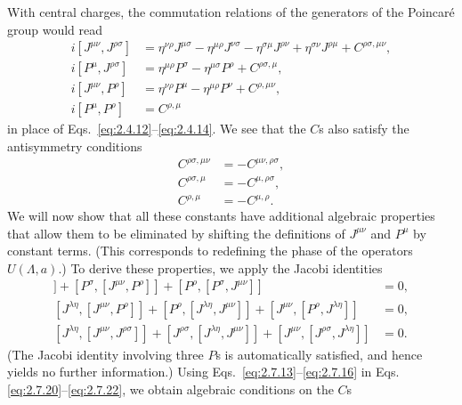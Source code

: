 With central charges, the commutation relations of the generators of the
Poincar\'e group would read
\begin{align}
  i[J^{\mu\nu},J^{\rho\sigma}]
  &={}
    \eta^{\nu\rho}J^{\mu\sigma}
    -\eta^{\mu\rho}J^{\nu\sigma}
    -\eta^{\sigma\mu}J^{\rho\nu}
    +\eta^{\sigma\nu}J^{\rho\mu}
    +C^{\rho\sigma,\mu\nu},
  \tag{2.7.13}\label{eq:2.7.13}\\
  i[P^\mu,J^{\rho\sigma}]
  &={}
    \eta^{\mu\rho}P^\sigma-\eta^{\mu\sigma}P^\rho
    +C^{\rho\sigma,\mu},
  \tag{2.7.14}\label{eq:2.7.14}\\
  i[J^{\mu\nu},P^\rho]
  &={}
    \eta^{\nu\rho}P^\mu-\eta^{\mu\rho}P^\nu
    +C^{\rho,\mu\nu},
  \tag{2.7.15}\label{eq:2.7.15}\\
  i[P^\mu,P^\rho]&=C^{\rho,\mu}
  \tag{2.7.16}\label{eq:2.7.16}
\end{align}
in place of Eqs.~\eqref{eq:2.4.12}--\eqref{eq:2.4.14}. We see that the $C$s also satisfy the
antisymmetry conditions
\begin{align}
  C^{\rho\sigma,\mu\nu}&=-C^{\mu\nu,\rho\sigma},
  \tag{2.7.17}\label{eq:2.7.17}\\
  C^{\rho\sigma,\mu}&=-C^{\mu,\rho\sigma},
  \tag{2.7.18}\label{eq:2.7.18}\\
  C^{\rho,\mu}&=-C^{\mu,\rho}.
  \tag{2.7.19}\label{eq:2.7.19}
\end{align}
We will now show that all these constants have additional algebraic properties
that allow them to be eliminated by shifting the definitions of $J^{\mu\nu}$
and $P^\mu$ by constant terms. (This corresponds to redefining the phase of the
operators $U(\Lambda,a)$.) To derive these properties, we apply the Jacobi
identities
\begin{align}
  [J^{\mu\nu},[P^\rho,P^\sigma]]
  +[P^\sigma,[J^{\mu\nu},P^\rho]]
  +[P^\rho,[P^\sigma,J^{\mu\nu}]]&=0,
  \tag{2.7.20}\label{eq:2.7.20}\\
  [J^{\lambda\eta},[J^{\mu\nu},P^\rho]]
  +[P^\rho,[J^{\lambda\eta},J^{\mu\nu}]]
  +[J^{\mu\nu},[P^\rho,J^{\lambda\eta}]]&=0,
  \tag{2.7.21}\label{eq:2.7.21}\\
  [J^{\lambda\eta},[J^{\mu\nu},J^{\rho\sigma}]]
  +[J^{\rho\sigma},[J^{\lambda\eta},J^{\mu\nu}]]
  +[J^{\mu\nu},[J^{\rho\sigma},J^{\lambda\eta}]]&=0.
  \tag{2.7.22}\label{eq:2.7.22}
\end{align}
(The Jacobi identity involving three $P$s is automatically satisfied, and hence
yields no further information.) Using Eqs.~\eqref{eq:2.7.13}--\eqref{eq:2.7.16} in Eqs.
\eqref{eq:2.7.20}--\eqref{eq:2.7.22}, we obtain algebraic conditions on the $C$s
